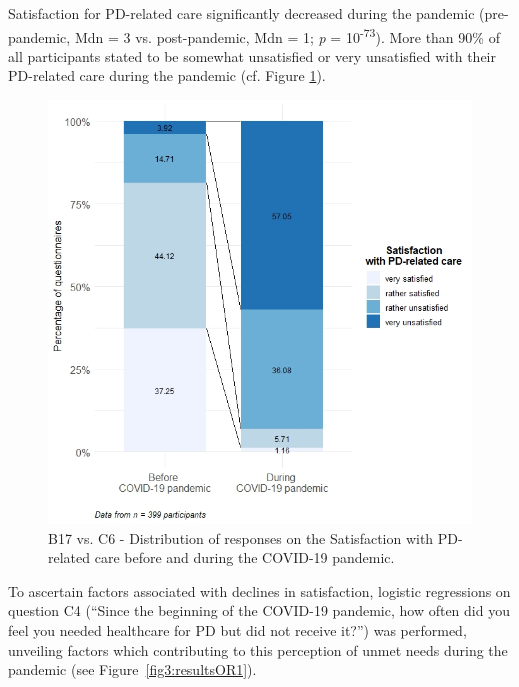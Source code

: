 \documentclass[a4paper,oneside,11pt,english]{scrartcl}
\begin{document}
Satisfaction for \textsc{PD}-related care significantly decreased during the pandemic (pre-pandemic, Mdn = 3 vs. post-pandemic, Mdn = 1; \textit{p} = 10\textsuperscript{-73}). More than 90\% of all participants stated to be somewhat unsatisfied or very unsatisfied with their \textsc{PD}-related care during the pandemic (cf. Figure \ref{fig2:satisfaction}). 

\begin{figure}[h!]
	\centering
	\includegraphics[width=.90\textwidth]{fig2.satisfaction.care.v1.0.jpeg}
	\caption{B17 vs. C6 - Distribution of responses on the Satisfaction with PD-related care before and during the \textsc{COVID}-19 pandemic.}
	\label{fig2:satisfaction}
\end{figure}

To ascertain factors associated with declines in satisfaction, logistic regressions on question C4 (``Since the beginning of the \textsc{COVID}-19 pandemic, how often did you feel you needed healthcare for \textsc{PD} but did not receive it?'') was performed, unveiling factors which contributing to this perception of unmet needs during the pandemic (see \mbox{Figure \ref{fig3:resultsOR1}}). 
\end{document}
